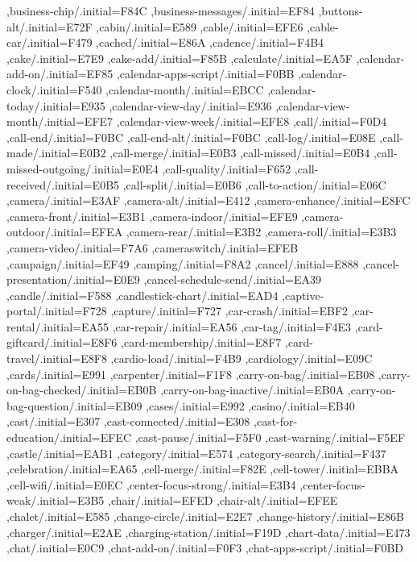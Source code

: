 { ,business-chip/.initial=F84C
 ,business-messages/.initial=EF84
 ,buttons-alt/.initial=E72F
 ,cabin/.initial=E589
 ,cable/.initial=EFE6
 ,cable-car/.initial=F479
 ,cached/.initial=E86A
 ,cadence/.initial=F4B4
 ,cake/.initial=E7E9
 ,cake-add/.initial=F85B
 ,calculate/.initial=EA5F
 ,calendar-add-on/.initial=EF85
 ,calendar-apps-script/.initial=F0BB
 ,calendar-clock/.initial=F540
 ,calendar-month/.initial=EBCC
 ,calendar-today/.initial=E935
 ,calendar-view-day/.initial=E936
 ,calendar-view-month/.initial=EFE7
 ,calendar-view-week/.initial=EFE8
 ,call/.initial=F0D4
 ,call-end/.initial=F0BC
 ,call-end-alt/.initial=F0BC
 ,call-log/.initial=E08E
 ,call-made/.initial=E0B2
 ,call-merge/.initial=E0B3
 ,call-missed/.initial=E0B4
 ,call-missed-outgoing/.initial=E0E4
 ,call-quality/.initial=F652
 ,call-received/.initial=E0B5
 ,call-split/.initial=E0B6
 ,call-to-action/.initial=E06C
 ,camera/.initial=E3AF
 ,camera-alt/.initial=E412
 ,camera-enhance/.initial=E8FC
 ,camera-front/.initial=E3B1
 ,camera-indoor/.initial=EFE9
 ,camera-outdoor/.initial=EFEA
 ,camera-rear/.initial=E3B2
 ,camera-roll/.initial=E3B3
 ,camera-video/.initial=F7A6
 ,cameraswitch/.initial=EFEB
 ,campaign/.initial=EF49
 ,camping/.initial=F8A2
 ,cancel/.initial=E888
 ,cancel-presentation/.initial=E0E9
 ,cancel-schedule-send/.initial=EA39
 ,candle/.initial=F588
 ,candlestick-chart/.initial=EAD4
 ,captive-portal/.initial=F728
 ,capture/.initial=F727
 ,car-crash/.initial=EBF2
 ,car-rental/.initial=EA55
 ,car-repair/.initial=EA56
 ,car-tag/.initial=F4E3
 ,card-giftcard/.initial=E8F6
 ,card-membership/.initial=E8F7
 ,card-travel/.initial=E8F8
 ,cardio-load/.initial=F4B9
 ,cardiology/.initial=E09C
 ,cards/.initial=E991
 ,carpenter/.initial=F1F8
 ,carry-on-bag/.initial=EB08
 ,carry-on-bag-checked/.initial=EB0B
 ,carry-on-bag-inactive/.initial=EB0A
 ,carry-on-bag-question/.initial=EB09
 ,cases/.initial=E992
 ,casino/.initial=EB40
 ,cast/.initial=E307
 ,cast-connected/.initial=E308
 ,cast-for-education/.initial=EFEC
 ,cast-pause/.initial=F5F0
 ,cast-warning/.initial=F5EF
 ,castle/.initial=EAB1
 ,category/.initial=E574
 ,category-search/.initial=F437
 ,celebration/.initial=EA65
 ,cell-merge/.initial=F82E
 ,cell-tower/.initial=EBBA
 ,cell-wifi/.initial=E0EC
 ,center-focus-strong/.initial=E3B4
 ,center-focus-weak/.initial=E3B5
 ,chair/.initial=EFED
 ,chair-alt/.initial=EFEE
 ,chalet/.initial=E585
 ,change-circle/.initial=E2E7
 ,change-history/.initial=E86B
 ,charger/.initial=E2AE
 ,charging-station/.initial=F19D
 ,chart-data/.initial=E473
 ,chat/.initial=E0C9
 ,chat-add-on/.initial=F0F3
 ,chat-apps-script/.initial=F0BD
}
